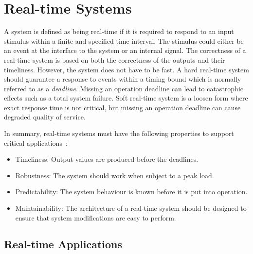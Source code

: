\section{Real-time Systems}
\label{sec:bg_realtime}

A system is defined as being real-time if it is required to respond to an input stimulus within a finite and specified time interval.
The stimulus could either be an event at the interface to the system or an internal signal.
The correctness of a real-time system is based on both the correctness of the outputs and their timeliness.
However, the system does not have to be fast.
A hard real-time system should guarantee a response to events within a timing bound which is normally referred to as a \textit{deadline}.
Missing an operation deadline can lead to catastrophic effects such as a total system failure. 
Soft real-time system is a loosen form where exact response time is not critical, but missing an operation deadline can cause degraded quality of service.

\pagebreak
In summary, real-time systems must have the following properties to support critical applications~\cite{buttazzo11}:
\begin{itemize}
\item Timeliness: Output values are produced before the deadlines.
\item Robustness: The system should work when subject to a peak load.
\item Predictability: The system behaviour is known before it is put into operation.
\item Maintainability: The architecture of a real-time system should be designed to ensure that system modifications are easy to perform.
\end{itemize}

\subsection{Real-time Applications}

